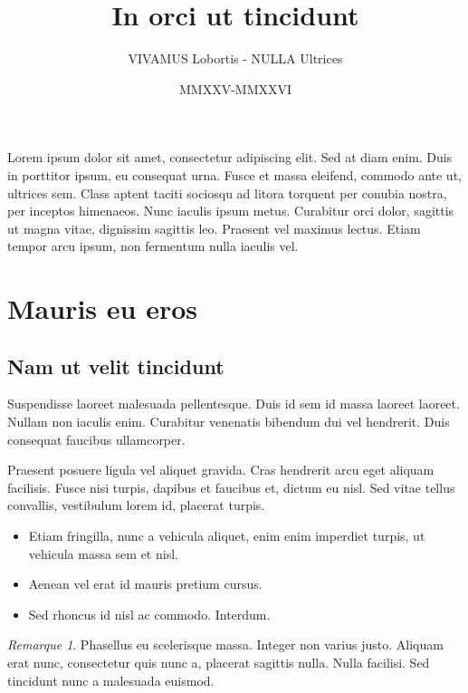 \documentclass[10pt,a4paper]{article}
\title{In orci ut tincidunt}
\author{VIVAMUS Lobortis - NULLA Ultrices}
\date{MMXXV-MMXXVI}
\title{\bfseries\huge\thetitle}
\theoremstyle{remark}
\newtheorem{remarque}{Remarque}
\begin{document}
\begin{introduction}
    Lorem ipsum dolor sit amet, consectetur adipiscing elit. Sed at diam enim. Duis in porttitor ipsum, eu consequat urna. Fusce et massa eleifend, commodo ante ut, ultrices sem. Class aptent taciti sociosqu ad litora torquent per conubia nostra, per inceptos himenaeos. Nunc iaculis ipsum metus. Curabitur orci dolor, sagittis ut magna vitae, dignissim sagittis leo. Praesent vel maximus lectus. Etiam tempor arcu ipsum, non fermentum nulla iaculis vel.
\end{introduction}

\tableofcontents
\vspace{10pt}

\section{Mauris eu eros}
\subsection{Nam ut velit tincidunt}

\begin{definition}
    Suspendisse laoreet malesuada pellentesque. Duis id sem id massa laoreet laoreet. Nullam non iaculis enim. Curabitur venenatis bibendum dui vel hendrerit. Duis consequat faucibus ullamcorper.  
\end{definition}

\begin{theoreme}
    Praesent posuere ligula vel aliquet gravida. Cras hendrerit arcu eget aliquam facilisis. Fusce nisi turpis, dapibus et faucibus et, dictum eu nisl. Sed vitae tellus convallis, vestibulum lorem id, placerat turpis.
\end{theoreme}

\begin{definitions}[vehiculis]
    \begin{itemize}
        \item Etiam fringilla, nunc a vehicula aliquet, enim enim imperdiet turpis, ut vehicula massa sem et nisl. 
        \item Aenean vel erat id mauris pretium cursus. 
        \item Sed rhoncus id nisl ac commodo. Interdum. 
    \end{itemize}
\end{definitions}

\begin{remarque}
    Phasellus eu scelerisque massa. Integer non varius justo. Aliquam erat nunc, consectetur quis nunc a, placerat sagittis nulla. Nulla facilisi. Sed tincidunt nunc a malesuada euismod. 
\end{remarque}
\end{document}
